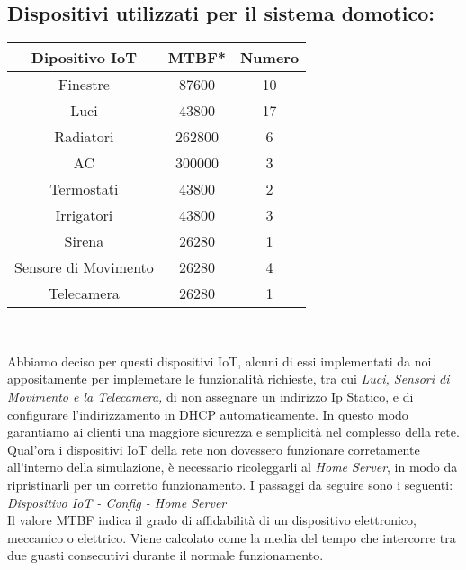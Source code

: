 \documentclass[italian, 12pt, a4paper]{article}
\begin{document}
\subsection{Dispositivi utilizzati per il sistema domotico:}\label{sec:domotico}
\begin{center}
    \renewcommand{\arraystretch}{1.5} %
    \begin{tabular}{|c|c|c|}
        \hline
        \rowcolor{violet!30}
        Dipositivo IoT & MTBF* & Numero\\
        \hline
        Finestre & 87600 & 10\\
        \hline
        Luci & 43800 & 17\\
        \hline
        Radiatori & 262800 & 6\\
        \hline
        AC & 300000 & 3\\
        \hline
        Termostati & 43800 & 2\\
        \hline
        Irrigatori & 43800 & 3\\
        \hline
        Sirena & 26280 & 1\\
        \hline
        Sensore di Movimento & 26280 & 4\\
        \hline
        Telecamera & 26280 & 1\\
        \hline
    \end{tabular}\\[4mm]
\end{center}
\vspace{1cm}
Abbiamo deciso per questi dispositivi IoT, alcuni di essi implementati da noi appositamente per implemetare le funzionalità richieste, tra cui \emph{Luci, Sensori di Movimento e la Telecamera,} di non assegnare un indirizzo Ip Statico, e di configurare l'indirizzamento in DHCP automaticamente. In questo modo garantiamo ai clienti una maggiore sicurezza e semplicità nel complesso della rete.\\
Qual'ora i dispositivi IoT della rete non dovessero funzionare corretamente all'interno della simulazione, è necessario ricoleggarli al \emph{Home Server}, in modo da ripristinarli per un corretto funzionamento. I passaggi da seguire sono i seguenti: \\ \emph{Dispositivo IoT - Config - Home Server} \\
Il valore MTBF indica il grado di affidabilità di un dispositivo elettronico, meccanico o elettrico. Viene calcolato come la media del tempo che intercorre tra due guasti consecutivi durante il normale funzionamento.
\clearpage
\end{document}
